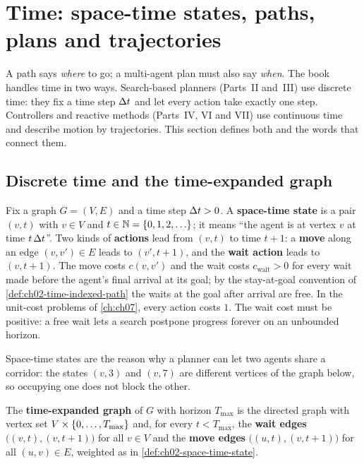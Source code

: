 \section{Time: space-time states, paths, plans and trajectories}
\label{sec:ch02-time}

A path says \emph{where} to go; a multi-agent plan must also say \emph{when}. The book handles time in two ways. Search-based planners (Parts~II and~III) use discrete time: they fix a time step $\Delta t$ and let every action take exactly one step. Controllers and reactive methods (Parts~IV, VI and VII) use continuous time and describe motion by trajectories. This section defines both and the words that connect them.

\subsection{Discrete time and the time-expanded graph}
\label{sec:ch02-space-time}

\begin{definition}
\label{def:ch02-space-time-state}
Fix a graph $G=(V,E)$ and a time step $\Delta t>0$. A \textbf{space-time state} is a pair $(v,t)$ with $v\in V$ and $t\in\N=\set{0,1,2,\dots}$; it means ``the agent is at vertex $v$ at time $t\,\Delta t$''. Two kinds of \textbf{actions} lead from $(v,t)$ to time $t+1$: a \textbf{move} along an edge $(v,v')\in E$ leads to $(v',t+1)$, and the \textbf{wait action} leads to $(v,t+1)$. The move costs $c(v,v')$ and the wait costs $c_{\text{wait}}>0$ for every wait made before the agent's final arrival at its goal; by the stay-at-goal convention of \cref{def:ch02-time-indexed-path} the waits at the goal after arrival are free. In the unit-cost problems of \cref{ch:ch07}, every action costs $1$. The wait cost must be positive: a free wait lets a search postpone progress forever on an unbounded horizon.
\end{definition}

Space-time states are the reason why a planner can let two agents share a corridor: the states $(v,3)$ and $(v,7)$ are different vertices of the graph below, so occupying one does not block the other.

\begin{definition}
\label{def:ch02-time-expanded-graph}
The \textbf{time-expanded graph} of $G$ with horizon $T_{\max}$ is the directed graph with vertex set $V\times\left\{ 0,\dots,T_{\max} \right\}$ and, for every $t<T_{\max}$, the \textbf{wait edges} $\bigl((v,t),(v,t+1)\bigr)$ for all $v\in V$ and the \textbf{move edges} $\bigl((u,t),(v,t+1)\bigr)$ for all $(u,v)\in E$, weighted as in \cref{def:ch02-space-time-state}.
\end{definition}

